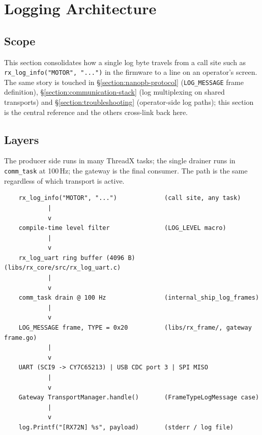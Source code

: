 
\section{Logging Architecture}
\label{section:logging-architecture}

\subsection{Scope}

This section consolidates how a single log byte travels from a call
site such as \texttt{rx\_log\_info("MOTOR", "...")} in the firmware to
a line on an operator's screen. The same story is touched in
\S\ref{section:nanopb-protocol} (\texttt{LOG\_MESSAGE} frame
definition), \S\ref{section:communication-stack} (log multiplexing on
shared transports) and \S\ref{section:troubleshooting} (operator-side
log paths); this section is the central reference and the others
cross-link back here.

\subsection{Layers}

The producer side runs in many ThreadX tasks; the single drainer runs
in \texttt{comm\_task} at 100\,Hz; the gateway is the final consumer.
The path is the same regardless of which transport is active.

\begin{verbatim}
    rx_log_info("MOTOR", "...")             (call site, any task)
            |
            v
    compile-time level filter               (LOG_LEVEL macro)
            |
            v
    rx_log_uart ring buffer (4096 B)        (libs/rx_core/src/rx_log_uart.c)
            |
            v
    comm_task drain @ 100 Hz                (internal_ship_log_frames)
            |
            v
    LOG_MESSAGE frame, TYPE = 0x20          (libs/rx_frame/, gateway frame.go)
            |
            v
    UART (SCI9 -> CY7C65213) | USB CDC port 3 | SPI MISO
            |
            v
    Gateway TransportManager.handle()       (FrameTypeLogMessage case)
            |
            v
    log.Printf("[RX72N] %s", payload)       (stderr / log file)
\end{verbatim}

